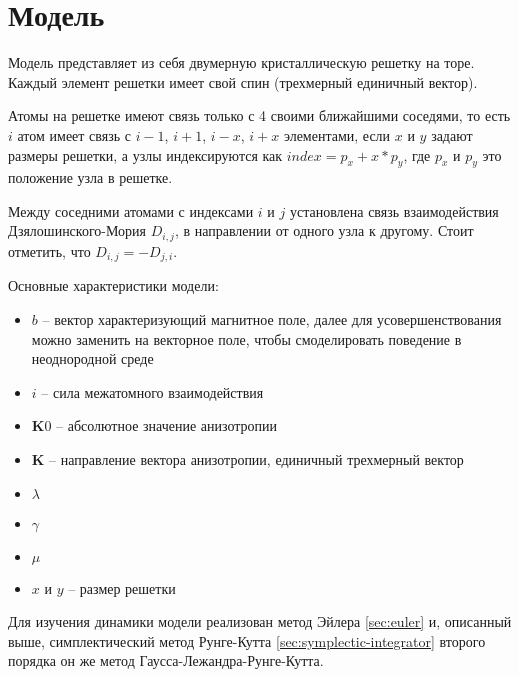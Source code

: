 \section{Модель}\label{sec:model}
Модель представляет из себя двумерную кристаллическую решетку на торе. Каждый
элемент решетки имеет свой спин (трехмерный единичный вектор).

Атомы на решетке имеют связь только с 4 своими ближайшими соседями,
то есть $i$ атом имеет связь с $i-1$, $i+1$, $i-x$, $i+x$ элементами,
если $x$ и $y$ задают размеры решетки, а узлы индексируются как
$index = p_x + x*p_y$, где $p_x$ и $p_y$ это положение
узла в решетке.

Между соседними атомами с индексами $i$ и $j$ установлена связь взаимодействия
Дзялошинского-Мория $D_{i,j}$, в направлении от одного узла к другому. Стоит
отметить, что $D_{i,j} = -D_{j,i}$.

Основные характеристики модели:
\begin{itemize}
\item $b$ -- вектор характеризующий магнитное поле, далее для
    усовершенствования можно заменить на векторное поле, чтобы смоделировать
    поведение в неоднородной среде
\item $i$ -- сила межатомного взаимодействия
\item $\mathbf K0$ -- абсолютное значение анизотропии
\item $\mathbf K$ -- направление вектора анизотропии, единичный трехмерный вектор
\item $\lambda$
\item $\gamma$
\item $\mu$
\item $x$ и $y$ -- размер решетки
\end{itemize}

Для изучения динамики модели реализован метод Эйлера \ref{sec:euler} и,
описанный выше, симплектический метод Рунге-Кутта
\ref{sec:symplectic-integrator} второго порядка он же метод
Гаусса-Лежандра-Рунге-Кутта.
